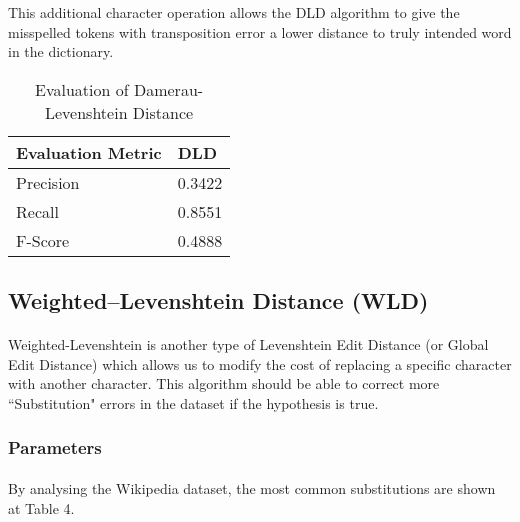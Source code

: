 \documentclass[11pt]{article}
\begin{document}
This additional character operation allows the DLD algorithm to give the misspelled tokens with transposition error a lower distance to truly intended word in the dictionary.

\begin{table}[!htbp]
 \begin{center}
\begin{tabular}{| l | l |}

      \hline
      Evaluation Metric & DLD \\
      \hline\hline
      Precision & 0.3422 \\
      Recall & 0.8551 \\
      F-Score & 0.4888 \\
      \hline

\end{tabular}
\caption{Evaluation of Damerau-Levenshtein Distance}\label{table3}
 \end{center}
\end{table}

\subsection{Weighted–Levenshtein Distance (WLD)}

\paragraph{} Weighted-Levenshtein is another type of Levenshtein Edit Distance (or Global Edit Distance) which allows us to modify the cost of replacing a specific character with another character. This algorithm should be able to correct more ``Substitution" errors in the dataset if the hypothesis is true.

\subsubsection{Parameters}

\paragraph{} By analysing the Wikipedia dataset, the most common substitutions are shown at Table 4.
\end{document}
